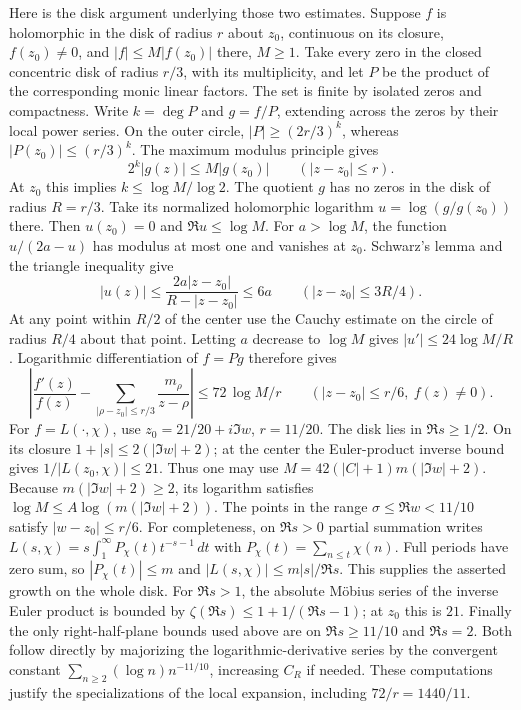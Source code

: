 Here is the disk argument underlying those two estimates. Suppose
\(f\) is holomorphic in the disk of radius \(r\) about \(z_0\),
continuous on its closure, \(f(z_0)\ne0\), and
\(|f|\le M|f(z_0)|\) there, \(M\ge1\).
Take every zero in the closed concentric disk of radius \(r/3\),
with its multiplicity, and let \(P\) be the product of the
corresponding monic linear factors. The set is finite by isolated
zeros and compactness. Write \(k=\deg P\) and \(g=f/P\), extending
across the zeros by their local power series. On the outer circle,
\(|P|\ge(2r/3)^k\), whereas \(|P(z_0)|\le(r/3)^k\). The maximum
modulus principle gives
\[
             2^k |g(z)|\le M |g(z_0)|\qquad (|z-z_0|\le r).
\]
At \(z_0\) this implies \(k\le\log M/\log2\). The quotient \(g\)
has no zeros in the disk of radius \(R=r/3\). Take its normalized
holomorphic logarithm \(u=\log(g/g(z_0))\) there. Then \(u(z_0)=0\)
and \(\Re u\le\log M\). For \(a>\log M\), the function
\(u/(2a-u)\) has modulus at most one and vanishes at \(z_0\).
Schwarz's lemma and the triangle inequality give
\[
 |u(z)|\le\frac{2a|z-z_0|}{R-|z-z_0|}\le6a
       \qquad (|z-z_0|\le3R/4).
\]
At any point within \(R/2\) of the center use the Cauchy estimate
on the circle of radius \(R/4\) about that point. Letting
\(a\) decrease to \(\log M\) gives \(|u'|\le24\log M/R\).
Logarithmic differentiation of \(f=Pg\) therefore gives
\[
 \left|\frac{f'(z)}{f(z)}
           -\sum_{|\rho-z_0|\le r/3}\frac{m_\rho}{z-\rho}\right|
     \le72\,\log M/r \qquad(|z-z_0|\le r/6,\ f(z)\ne0).
\]
For \(f=L(\cdot,\chi)\), use \(z_0=21/20+i\Im w\),
\(r=11/20\). The disk lies in \(\Re s\ge1/2\). On its closure
\(1+|s|\le2(|\Im w|+2)\); at the center the Euler-product inverse
bound gives \(1/|L(z_0,\chi)|\le21\). Thus one may use
\(M=42(|C|+1)m(|\Im w|+2)\).
Because \(m(|\Im w|+2)\ge2\), its logarithm satisfies
\(\log M\le A\log(m(|\Im w|+2))\).
The points in the range
\(\sigma\le\Re w<11/10\) satisfy \(|w-z_0|\le r/6\).
For completeness, on \(\Re s>0\) partial summation writes
\(L(s,\chi)=s\int_1^\infty P_\chi(t)t^{-s-1}\,dt\) with
\(P_\chi(t)=\sum_{n\le t}\chi(n)\). Full periods have zero sum,
so \(|P_\chi(t)|\le m\) and \(|L(s,\chi)|\le m|s|/\Re s\).
This supplies the asserted growth on the whole disk. For
\(\Re s>1\), the absolute Möbius series of the inverse Euler
product is bounded by \(\zeta(\Re s)\le1+1/(\Re s-1)\);
at \(z_0\) this is \(21\). Finally the only right-half-plane
bounds used above are on \(\Re s\ge11/10\) and \(\Re s=2\).
Both follow directly by majorizing the logarithmic-derivative
series by the convergent constant
\(\sum_{n\ge2}(\log n)n^{-11/10}\), increasing \(C_R\) if needed.
These computations justify the specializations of the local
expansion, including \(72/r=1440/11\).

